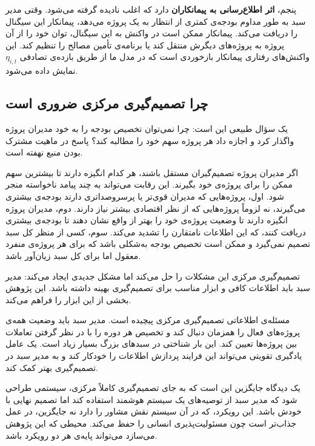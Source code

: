 پنجم، \textbf{اثر اطلاع‌رسانی به پیمانکاران} دارد که اغلب
نادیده گرفته می‌شود. وقتی مدیر سبد به طور مداوم بودجه‌ی کمتری
از انتظار به یک پروژه می‌دهد، پیمانکار این سیگنال را دریافت
می‌کند. پیمانکار ممکن است در واکنش به این سیگنال، توان خود را
از آن پروژه به پروژه‌های دیگرش منتقل کند یا برنامه‌ی تأمین
مصالح را تنظیم کند. این واکنش‌های رفتاری پیمانکار بازخوردی
است که در مدل ما از طریق بازده‌ی تصادفی $\eta_{i,t}$ نمایش
داده می‌شود.

\subsection{چرا تصمیم‌گیری مرکزی ضروری است}
\label{subsec:centralized_decision}

یک سؤال طبیعی این است: چرا نمی‌توان تخصیص بودجه را به خود مدیران
پروژه واگذار کرد و اجازه داد هر پروژه سهم خود را مطالبه کند؟
پاسخ در ماهیت مشترک بودن منبع نهفته است.

اگر مدیران پروژه تصمیم‌گیران مستقل باشند، هر کدام انگیزه دارند
تا بیشترین سهم ممکن را برای پروژه‌ی خود بگیرند. این رقابت می‌تواند
به چند پیامد ناخواسته منجر شود. اول، پروژه‌هایی که مدیران
قوی‌تر یا پرسروصداتری دارند بودجه‌ی بیشتری می‌گیرند، نه لزوماً
پروژه‌هایی که از نظر اقتصادی بیشتر نیاز دارند. دوم، مدیران
پروژه انگیزه دارند تا وضعیت پروژه‌ی خود را بهتر از واقع نشان
دهند تا بودجه‌ی بیشتری دریافت کنند، که این اطلاعات نامتقارن
را تشدید می‌کند. سوم، کسی از منظر کل سبد تصمیم نمی‌گیرد و
ممکن است تخصیص بودجه به‌شکلی باشد که برای هر پروژه‌ی منفرد
معقول اما برای کل سبد زیان‌آور باشد.

تصمیم‌گیری مرکزی این مشکلات را حل می‌کند اما مشکل جدیدی ایجاد
می‌کند: مدیر سبد باید اطلاعات کافی و ابزار مناسب برای تصمیم‌گیری
بهینه داشته باشد. این پژوهش بخشی از این ابزار را فراهم می‌کند.

مسئله‌ی اطلاعاتی تصمیم‌گیری مرکزی پیچیده است. مدیر سبد باید
وضعیت همه‌ی پروژه‌های فعال را همزمان دنبال کند و تخصیص هر دوره
را با در نظر گرفتن تعاملات بین پروژه‌ها تعیین کند. این بار
شناختی در سبدهای بزرگ بسیار زیاد است. یک عامل یادگیری تقویتی
می‌تواند این فرایند پردازش اطلاعات را خودکار کند و به مدیر
سبد در تصمیم‌گیری بهتر کمک کند.

یک دیدگاه جایگزین این است که به جای تصمیم‌گیری کاملاً مرکزی،
سیستمی طراحی شود که مدیر سبد از توصیه‌های یک سیستم هوشمند
استفاده کند اما تصمیم نهایی با خودش باشد. این رویکرد، که
در آن سیستم نقش مشاور را دارد نه جایگزین، در عمل جذاب‌تر
است چون مسئولیت‌پذیری انسانی را حفظ می‌کند. محیطی که این
پژوهش می‌سازد می‌تواند پایه‌ی هر دو رویکرد باشد.

